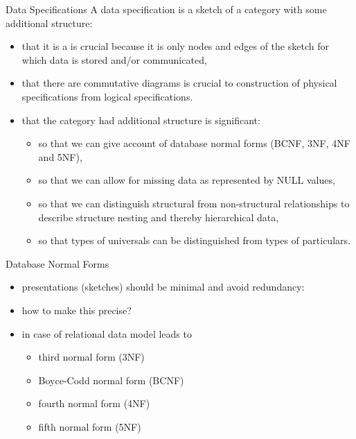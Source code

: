 \begin{frame}{Data Specifications}
A data specification is a sketch of a category with some additional structure:
\begin{itemize}
\item that it is a  is crucial because it is only nodes and edges of the sketch for which data is stored and/or communicated, 
\item that there are commutative diagrams is crucial to construction of physical 
specifications from logical specifications.
\item that the category had additional structure is significant:
\begin{itemize}
\item so that we can give account of database normal forms 
(BCNF, 3NF, 4NF and 5NF),
\item so that we can allow for missing data as represented by NULL values, 
\item so that we can distinguish structural from non-structural relationships to describe structure nesting and thereby hierarchical data,
\item so that types of universals can be distinguished from types of particulars.
\end{itemize}
\end{itemize}
\end{frame}




\begin{frame}{Database Normal Forms}
\begin{itemize}
\item presentations (sketches) should be minimal and avoid redundancy:
\item how to make this precise?
\item in case of relational data model leads to 
   \begin{itemize}
     \item third normal form (3NF)
     \item Boyce-Codd normal form (BCNF)
     \item fourth normal form (4NF)
     \item fifth normal form (5NF)
   \end{itemize}
\end{itemize}
\end{frame}


